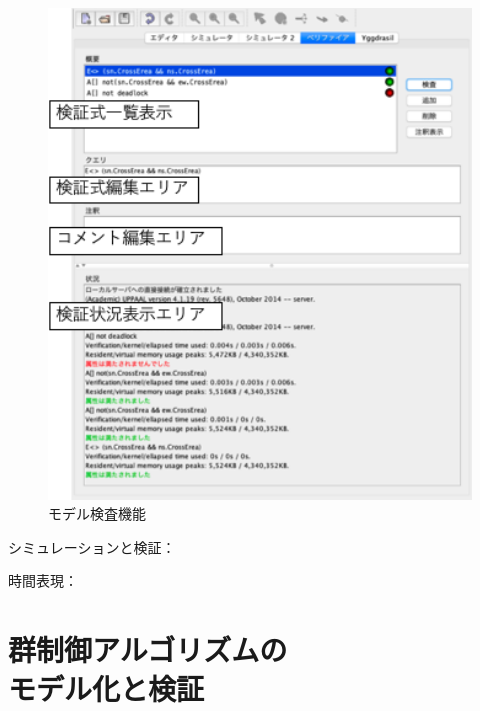 \documentclass{tpu-sotu}
\begin{document}
	\begin{figure}[htbp]
	\centering
	\includegraphics[width=140mm]{showModelVerification.png}
	\caption{モデル検査機能}
	\label{sMV}
	\end{figure}
	シミュレーションと検証：
	
	時間表現：
	
\chapter{群制御アルゴリズムの\\モデル化と検証}
\end{document}
